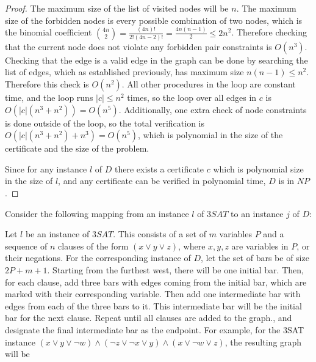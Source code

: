 \documentclass[11pt]{article}
\begin{document}
\begin{proof}
    The maximum size of the list of visited nodes will be $n$. The maximum size of the forbidden nodes is every possible combination of two nodes, which is the binomial coefficient $\binom{4n}{2} = \frac{(4n)!}{2!(4n-2)!} = \frac{4n(n-1)}{2} \leq 2n^2$. Therefore checking that the current node does not violate any forbidden pair constraints is $O(n^3)$. Checking that the edge is a valid edge in the graph can be done by searching the list of edges, which as established previously, has maximum size $n(n-1) \leq n^2$. Therefore this check is $O(n^2)$. All other procedures in the loop are constant time, and the loop runs $|c| \leq n^2$ times, so the loop over all edges in $c$ is $O(|c|(n^3 + n^2)) = O(n^5)$. Additionally, one extra check of node constraints is done outside of the loop, so the total verification is $O(|c|(n^3 + n^2) + n^3) = O(n^5)$, which is polynomial in the size of the certificate and the size of the problem.

    Since for any instance $l$ of $D$ there exists a certificate $c$ which is polynomial size in the size of $l$, and any certificate can be verified in polynomial time, $D$ is in $NP$.
\end{proof}

Consider the following mapping from an instance $l$ of $3SAT$ to an instance $j$ of $D$:

Let $l$ be an instance of $3SAT$. This consists of a set of $m$ variables $P$ and a sequence of $n$ clauses of the form $(x \lor y \lor z)$, where $x, y, z$ are variables in $P$, or their negations. For the corresponding instance of $D$, let the set of bars be of size $2P + m + 1$. Starting from the furthest west, there will be one initial bar. Then, for each clause, add three bars with edges coming from the initial bar, which are marked with their corresponding variable. Then add one intermediate bar with edges from each of the three bars to it. This intermediate bar will be the initial bar for the next clause. Repeat until all clauses are added to the graph., and designate the final intermediate bar as the endpoint. For example, for the 3SAT instance $(x \lor y \lor \lnot w) \land (\lnot z \lor \lnot x \lor y) \land (x \lor \lnot w \lor z)$, the resulting graph will be 
\begin{figure}[H]
    \centering
\end{figure}
\end{document}
